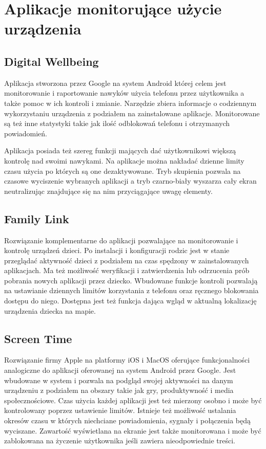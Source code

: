\section{Aplikacje monitorujące użycie urządzenia}

\subsection{Digital Wellbeing}
\label{sec:digital_wellbeing}
Aplikacja stworzona przez Google na system Android której celem jest monitorowanie i raportowanie nawyków użycia telefonu przez użytkownika a także pomoc w ich kontroli i zmianie. Narzędzie zbiera informacje o codziennym wykorzystaniu urządzenia z podziałem na zainstalowane aplikacje. Monitorowane są też inne statystyki takie jak ilość odblokowań telefonu i otrzymanych powiadomień. 
\bigskip
{}

Aplikacja posiada też szereg funkcji mających dać użytkownikowi większą kontrolę nad swoimi nawykami. Na aplikacje można nakładać dzienne limity czasu użycia po których są one dezaktywowane. Tryb skupienia pozwala na czasowe wyciszenie wybranych aplikacji a tryb czarno-biały wyszarza cały ekran neutralizując znajdujące się na nim przyciągające uwagę elementy.

\subsection{Family Link}
Rozwiązanie komplementarne do aplikacji  pozwalające na monitorowanie i kontrolę urządzeń dzieci. Po instalacji i konfiguracji rodzic jest w stanie przeglądać aktywność dzieci z podziałem na czas spędzony w zainstalowanych aplikacjach. Ma też możliwość weryfikacji i zatwierdzenia lub odrzucenia prób pobrania nowych aplikacji przez dziecko. Wbudowane funkcje kontroli pozwalają na ustawianie dziennych limitów korzystania z telefonu oraz ręcznego blokowania dostępu do niego. Dostępna jest też funkcja dająca wgląd w aktualną lokalizację urządzenia dziecka na mapie.

\subsection{Screen Time}
Rozwiązanie firmy Apple na platformy iOS i MacOS oferujące funkcjonalności analogiczne do aplikacji  oferowanej na system Android przez Google. Jest wbudowane w system i pozwala na podgląd swojej aktywności na danym urządzeniu z podziałem na obszary takie jak gry, produktywność i media społecznościowe. Czas użycia każdej aplikacji jest też mierzony osobno i może być kontrolowany poprzez ustawienie limitów. Istnieje też możliwość ustalania okresów czasu w których niechciane powiadomienia, sygnały i połączenia będą wyciszane. Zawartość wyświetlana na ekranie jest także monitorowana i może być zablokowana na życzenie użytkownika jeśli zawiera nieodpowiednie treści.

